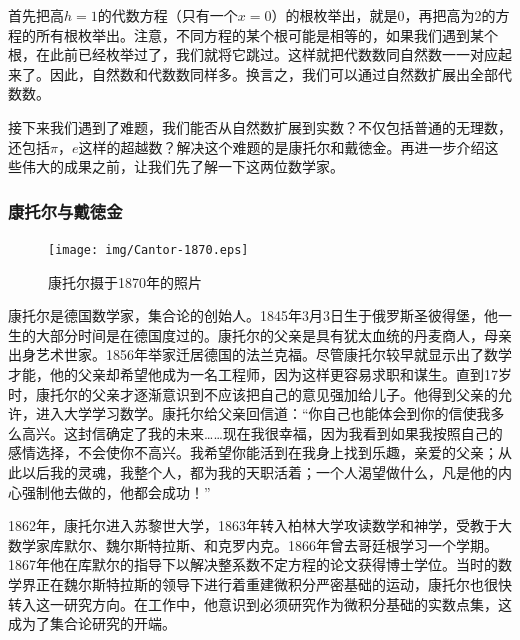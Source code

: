 \documentclass{article}
\begin{document}
\begin{enumerate}
首先把高$h=1$的代数方程（只有一个$x = 0$）的根枚举出，就是0，再把高为2的方程的所有根枚举出。注意，不同方程的某个根可能是相等的，如果我们遇到某个根，在此前已经枚举过了，我们就将它跳过。这样就把代数数同自然数一一对应起来了。因此，自然数和代数数同样多。换言之，我们可以通过自然数扩展出全部代数数。
\end{enumerate}

接下来我们遇到了难题，我们能否从自然数扩展到实数？不仅包括普通的无理数，还包括$\pi$，$e$这样的超越数？解决这个难题的是康托尔和戴徳金。再进一步介绍这些伟大的成果之前，让我们先了解一下这两位数学家。

\subsubsection{康托尔与戴徳金}

\begin{figure}
 \centering
 \texttt{[image: img/Cantor-1870.eps]}
 \captionsetup{labelformat=empty}
 \caption{康托尔摄于1870年的照片}
 \label{fig:Cantor-1870}
\end{figure}

康托尔是德国数学家，集合论的创始人。1845年3月3日生于俄罗斯圣彼得堡，他一生的大部分时间是在德国度过的。康托尔的父亲是具有犹太血统的丹麦商人，母亲出身艺术世家。1856年举家迁居德国的法兰克福。尽管康托尔较早就显示出了数学才能，他的父亲却希望他成为一名工程师，因为这样更容易求职和谋生。直到17岁时，康托尔的父亲才逐渐意识到不应该把自己的意见强加给儿子。他得到父亲的允许，进入大学学习数学。康托尔给父亲回信道：“你自己也能体会到你的信使我多么高兴。这封信确定了我的未来……现在我很幸福，因为我看到如果我按照自己的感情选择，不会使你不高兴。我希望你能活到在我身上找到乐趣，亲爱的父亲；从此以后我的灵魂，我整个人，都为我的天职活着；一个人渴望做什么，凡是他的内心强制他去做的，他都会成功！”\cite{HanXueTao16}

1862年，康托尔进入苏黎世大学，1863年转入柏林大学攻读数学和神学，受教于大数学家库默尔、魏尔斯特拉斯、和克罗内克。1866年曾去哥廷根学习一个学期。1867年他在库默尔的指导下以解决整系数不定方程的论文获得博士学位。当时的数学界正在魏尔斯特拉斯的领导下进行着重建微积分严密基础的运动，康托尔也很快转入这一研究方向。在工作中，他意识到必须研究作为微积分基础的实数点集，这成为了集合论研究的开端。
\end{document}
